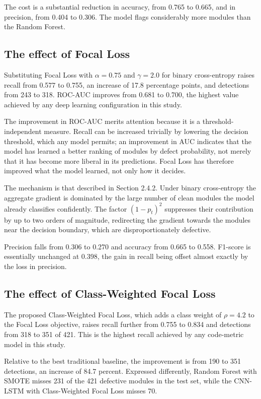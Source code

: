 \documentclass[12pt,a4paper,oneside]{report}
\begin{document}
The cost is a substantial reduction in accuracy, from 0.765 to 0.665, and in precision, from 0.404 to 0.306. The model flags considerably more modules than the Random Forest.

\subsection{The effect of Focal Loss}

Substituting Focal Loss with $\alpha = 0.75$ and $\gamma = 2.0$ for binary cross-entropy raises recall from 0.577 to 0.755, an increase of 17.8 percentage points, and detections from 243 to 318. ROC-AUC improves from 0.681 to 0.700, the highest value achieved by any deep learning configuration in this study.

The improvement in ROC-AUC merits attention because it is a threshold-independent measure. Recall can be increased trivially by lowering the decision threshold, which any model permits; an improvement in AUC indicates that the model has learned a better ranking of modules by defect probability, not merely that it has become more liberal in its predictions. Focal Loss has therefore improved what the model learned, not only how it decides.

The mechanism is that described in Section 2.4.2. Under binary cross-entropy the aggregate gradient is dominated by the large number of clean modules the model already classifies confidently. The factor $(1 - p_t)^{2}$ suppresses their contribution by up to two orders of magnitude, redirecting the gradient towards the modules near the decision boundary, which are disproportionately defective.

Precision falls from 0.306 to 0.270 and accuracy from 0.665 to 0.558. F1-score is essentially unchanged at 0.398, the gain in recall being offset almost exactly by the loss in precision.

\subsection{The effect of Class-Weighted Focal Loss}

The proposed Class-Weighted Focal Loss, which adds a class weight of $\rho = 4.2$ to the Focal Loss objective, raises recall further from 0.755 to 0.834 and detections from 318 to 351 of 421. This is the highest recall achieved by any code-metric model in this study.

Relative to the best traditional baseline, the improvement is from 190 to 351 detections, an increase of 84.7 percent. Expressed differently, Random Forest with SMOTE misses 231 of the 421 defective modules in the test set, while the CNN-LSTM with Class-Weighted Focal Loss misses 70.
\end{document}
